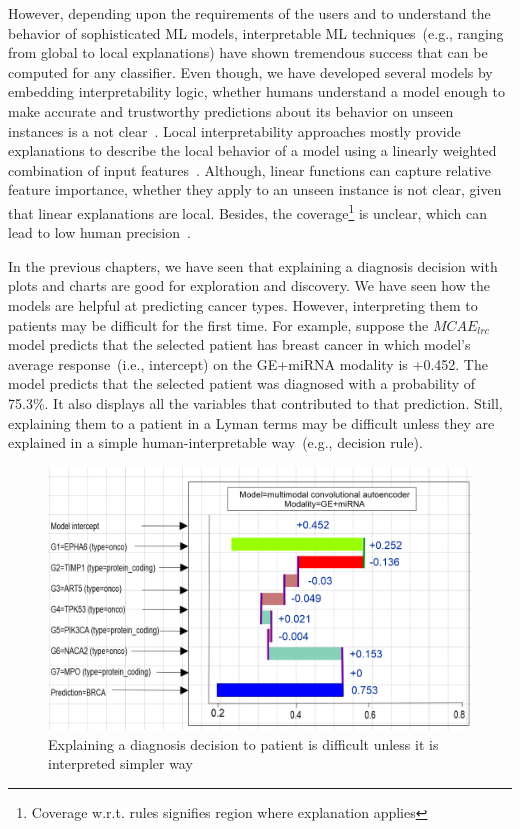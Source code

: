 \hspace*{3.5mm} However, depending upon the requirements of the users and to understand the behavior of sophisticated ML models, interpretable ML techniques~(e.g., ranging from global to local explanations) have shown tremendous success that can be computed for any classifier. Even though, we have developed several models by embedding interpretability logic, whether humans understand a model enough to make accurate and trustworthy predictions about its behavior on unseen instances is a not clear~\cite{ribeiro2018anchors}. Local interpretability approaches mostly provide explanations to describe the local behavior of a model using a linearly weighted combination of input features~\cite{baehrens2010explain}. Although, linear functions can capture relative feature importance, whether they apply to an unseen instance is not clear, given that linear explanations are local. Besides, the coverage\footnote{Coverage w.r.t. rules signifies region where explanation applies} is unclear, which can lead to low human precision~\cite{ribeiro2018anchors}. 

\hspace*{3.5mm} In the previous chapters, we have seen that explaining a diagnosis decision with plots and charts are good for exploration and discovery. We have seen how the models are helpful at predicting cancer types. However, interpreting them to patients may be difficult for the first time. For example, suppose the $MCAE_{lrc}$ model predicts that the selected patient has breast cancer in which model's average response~(i.e., intercept) on the GE+miRNA modality is +0.452. The model predicts that the selected patient was diagnosed with a probability of 75.3\%. It also displays all the variables that contributed to that prediction. Still, explaining them to a patient in a Lyman terms may be difficult unless they are explained in a simple human-interpretable way~(e.g., decision rule).  

\begin{figure}[h]
	\centering
		\includegraphics[scale=0.6]{images/intercept.png}
	    \caption{Explaining a diagnosis decision to patient is difficult unless it is interpreted simpler way}
	\label{problem_of_xai:1}
\end{figure}

